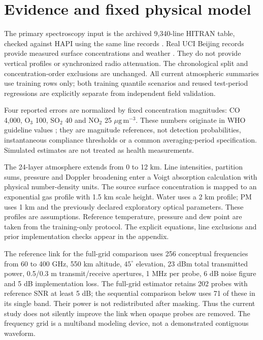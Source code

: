 \documentclass[conference]{IEEEtran}
\newcommand{\ugm}{\ensuremath{\mu\mathrm{g\,m}^{-3}}}
\begin{document}
\section{Evidence and fixed physical model}
The primary spectroscopy input is the archived 9,340-line HITRAN table, checked against HAPI using the same line records \cite{gordon2026hitran,kochanov2016hapi}. Real UCI Beijing records provide measured surface concentrations and weather \cite{chen2017beijing}. They do not provide vertical profiles or synchronized radio attenuation. The chronological split and concentration-order exclusions are unchanged. All current atmospheric summaries use training rows only; both training quantile scenarios and reused test-period regressions are explicitly separate from independent field validation.

Four reported errors are normalized by fixed concentration magnitudes: CO 4,000, O$_3$ 100, SO$_2$ 40 and NO$_2$ 25 \ugm. These numbers originate in WHO guideline values \cite{who2021aqg}; they are magnitude references, not detection probabilities, instantaneous compliance thresholds or a common averaging-period specification. Simulated estimates are not treated as health measurements.

The 24-layer atmosphere extends from 0 to 12 km. Line intensities, partition sums, pressure and Doppler broadening enter a Voigt absorption calculation with physical number-density units. The source surface concentration is mapped to an exponential gas profile with 1.5 km scale height. Water uses a 2 km profile; PM uses 1 km and the previously declared exploratory optical parameters. These profiles are assumptions. Reference temperature, pressure and dew point are taken from the training-only protocol. The explicit equations, line exclusions and prior implementation checks appear in the appendix.

The reference link for the full-grid comparison uses 256 conceptual frequencies from 60 to 400 GHz, 550 km altitude, $45^\circ$ elevation, 23 dBm total transmitted power, 0.5/0.3 m transmit/receive apertures, 1 MHz per probe, 6 dB noise figure and 5 dB implementation loss. The full-grid estimator retains 202 probes with reference SNR at least 5 dB; the sequential comparison below uses 71 of these in its single band. Their power is not redistributed after masking. Thus the current study does not silently improve the link when opaque probes are removed. The frequency grid is a multiband modeling device, not a demonstrated contiguous waveform.
\end{document}
